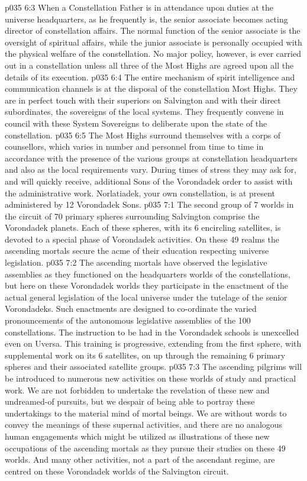 \vs p035 6:3 When a Constellation Father is in attendance upon duties at the universe headquarters, as he frequently is, the senior associate becomes acting director of constellation affairs. The normal function of the senior associate is the oversight of spiritual affairs, while the junior associate is personally occupied with the physical welfare of the constellation. No major policy, however, is ever carried out in a constellation unless all three of the Most Highs are agreed upon all the details of its execution.
\vs p035 6:4 The entire mechanism of spirit intelligence and communication channels is at the disposal of the constellation Most Highs. They are in perfect touch with their superiors on Salvington and with their direct subordinates, the sovereigns of the local systems. They frequently convene in council with these System Sovereigns to deliberate upon the state of the constellation.
\vs p035 6:5 The Most Highs surround themselves with a corps of counsellors, which varies in number and personnel from time to time in accordance with the presence of the various groups at constellation headquarters and also as the local requirements vary. During times of stress they may ask for, and will quickly receive, additional Sons of the Vorondadek order to assist with the administrative work. Norlatiadek, your own constellation, is at present administered by 12 Vorondadek Sons.
\vs p035 7:1 The second group of 7 worlds in the circuit of 70 primary spheres surrounding Salvington comprise the Vorondadek planets. Each of these spheres, with its 6 encircling satellites, is devoted to a special phase of Vorondadek activities. On these 49 realms the ascending mortals secure the acme of their education respecting universe legislation.
\vs p035 7:2 The ascending mortals have observed the legislative assemblies as they functioned on the headquarters worlds of the constellations, but here on these Vorondadek worlds they participate in the enactment of the actual general legislation of the local universe under the tutelage of the senior Vorondadeks. Such enactments are designed to co\hyp{}ordinate the varied pronouncements of the autonomous legislative assemblies of the 100 constellations. The instruction to be had in the Vorondadek schools is unexcelled even on Uversa. This training is progressive, extending from the first sphere, with supplemental work on its 6 satellites, on up through the remaining 6 primary spheres and their associated satellite groups.
\vs p035 7:3 The ascending pilgrims will be introduced to numerous new activities on these worlds of study and practical work. We are not forbidden to undertake the revelation of these new and undreamed\hyp{}of pursuits, but we despair of being able to portray these undertakings to the material mind of mortal beings. We are without words to convey the meanings of these supernal activities, and there are no analogous human engagements which might be utilized as illustrations of these new occupations of the ascending mortals as they pursue their studies on these 49 worlds. And many other activities, not a part of the ascendant regime, are centred on these Vorondadek worlds of the Salvington circuit.
